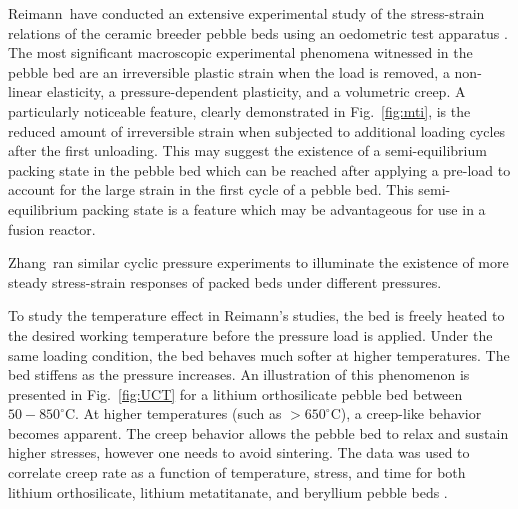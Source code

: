 Reimann\etal~have conducted an extensive experimental study of the stress-strain relations of the ceramic breeder pebble beds using an oedometric test apparatus \cite{Piazza2002811,Reimann:2002kl,Reimann:2003qc,Reimann:2002mi,Reimann:2001il}. The most significant macroscopic experimental phenomena witnessed in the pebble bed are an irreversible plastic strain when the load is removed, a non-linear elasticity, a pressure-dependent plasticity, and a volumetric creep.  A particularly noticeable feature, clearly demonstrated in Fig.~\ref{fig:mti}, is the reduced amount of irreversible strain when subjected to additional loading cycles after the first unloading. This may suggest the existence of a semi-equilibrium packing state in the pebble bed which can be reached after applying a pre-load to account for the large strain in the first cycle of a pebble bed. This semi-equilibrium packing state is a feature which may be advantageous for use in a fusion reactor.

Zhang\etal~ran similar cyclic pressure experiments to illuminate the existence of more steady stress-strain responses of packed beds under different pressures. 

To study the temperature effect in Reimann's studies, the bed is freely heated to the desired working temperature before the pressure load is applied. Under the same loading condition, the bed behaves much softer at higher temperatures. The bed stiffens as the pressure increases. An illustration of this phenomenon is presented in Fig.~\ref{fig:UCT} for a lithium orthosilicate pebble bed between $50-850^\circ$C. At higher temperatures (such as $> 650^\circ$C), a creep-like behavior becomes apparent. The creep behavior allows the pebble bed to relax and sustain higher stresses, however one needs to avoid sintering. The data was used to correlate creep rate as a function of temperature, stress, and time for both lithium orthosilicate, lithium metatitanate, and beryllium pebble beds \cite{Buhler:2002qf,Reimann:2001il,Reimann2005}.


